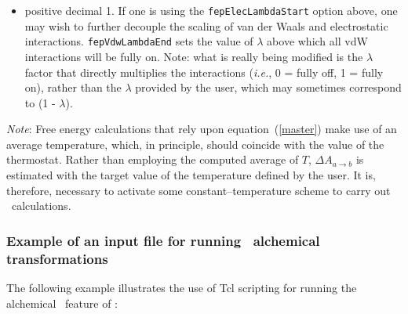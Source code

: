 \begin{itemize}
\item
{}
{positive decimal}
{1.}
{If one is using the {\tt fepElecLambdaStart} option above, one may wish to further decouple the scaling of van der Waals and electrostatic interactions. {\tt fepVdwLambdaEnd} sets the value of $\lambda$ above which all vdW interactions will be fully on. Note: what is really being modified is the $\lambda$ factor that directly multiplies the interactions (\emph{i.e.}, 0 = fully off, 1 = fully on), rather than the $\lambda$ provided by the user, which may sometimes correspond to (1 - $\lambda$).}





\end{itemize}


\noindent
{\it Note}: Free energy calculations that rely upon equation~({\ref{master}})
make use of an average temperature, which, in principle, should coincide with
the value of the thermostat. Rather than employing the computed average of $T$,
$\Delta A_{a \rightarrow b}$ is estimated with the target value of the
temperature defined by the user. It is, therefore, necessary to activate
some constant--temperature scheme to carry out \FEP\ calculations. 



\subsubsection{Example of an input file for running \FEP\ alchemical transformations}


The following example illustrates the use of {\sc Tcl} scripting for running
the alchemical \FEP\ feature of \NAMD: 

